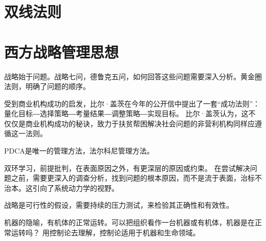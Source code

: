 \section{双线法则}

\section{西方战略管理思想}

战略始于问题。战略七问，德鲁克五问，如何回答这些问题需要深入分析。黄金圈法则，明确了问题的顺序。

受到商业机构成功的启发，比尔·盖茨在今年的公开信中提出了一套“成功法则”：量化目标―选择策略―考量结果―调整策略―实现目标。
比尔·盖茨认为，这不仅仅是商业机构成功的秘诀，致力于扶贫帮困解决社会问题的非营利机构同样应遵循这一法则。

PDCA是唯一的管理方法，法尔科尼管理方法。

双环学习，前提批判，在表面原因之外，有更深层的原因或约束。
在尝试解决问题之前，需要更深入的调查分析，找到问题的根本原因，而不是流于表面，治标不治本。这引向了系统动力学的视野。

战略是可行性的假设，需要持续的压力测试，来检验其正确性和有效性。

机器的隐喻，有机体的正常运转。可以把组织看作一台机器或有机体，机器是在正常运转吗？
用控制论去理解，控制论适用于机器和生命领域。
